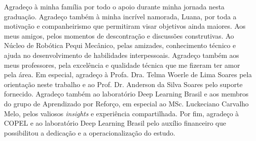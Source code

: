 \begin{agradecimentos}
Agradeço à minha família por todo o apoio durante minha jornada nesta graduação. Agradeço também à minha incrível namorada, Luana, por toda a motivação e companheirismo que permitiram visar objetivos ainda maiores. Aos meus amigos, pelos momentos de descontração e discussões construtivas. Ao Núcleo de Robótica Pequi Mecânico, pelas amizades, conhecimento técnico e ajuda no desenvolvimento de habilidades interpessoais. Agradeço também aos meus professores, pela excelência e qualidade técnica que me fizeram ter amor pela área. Em especial, agradeço à Profa. Dra. Telma Woerle de Lima Soares pela orientação neste trabalho e ao Prof. Dr. Anderson da Silva Soares pelo suporte fornecido. Agradeço também ao laboratório Deep Learning Brasil e aos membros do grupo de Aprendizado por Reforço, em especial ao MSc. Luckeciano Carvalho Melo, pelos valiosos \textit{insights} e experiência compartilhada. Por fim, agradeço à COPEL e ao laboratório Deep Learning Brasil pelo auxílio financeiro que possibilitou a dedicação e a operacionalização do estudo.
\end{agradecimentos}